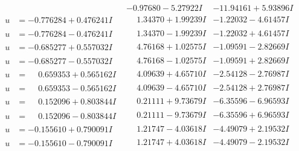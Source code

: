 \documentclass[1p]{elsarticle_modified}
\theoremstyle{definition}
\begin{document}
$$\begin{array}{c|c|c}
 & -0.97680 - 5.27922 I & -11.94161 + 5.93896 I \\ \hline\begin{aligned}
u &= -0.776284 + 0.476241 I\end{aligned}
 & \phantom{-}1.34370 + 1.99239 I & -1.22032 - 4.61457 I \\ \hline\begin{aligned}
u &= -0.776284 - 0.476241 I\end{aligned}
 & \phantom{-}1.34370 - 1.99239 I & -1.22032 + 4.61457 I \\ \hline\begin{aligned}
u &= -0.685277 + 0.557032 I\end{aligned}
 & \phantom{-}4.76168 + 1.02575 I & -1.09591 - 2.82669 I \\ \hline\begin{aligned}
u &= -0.685277 - 0.557032 I\end{aligned}
 & \phantom{-}4.76168 - 1.02575 I & -1.09591 + 2.82669 I \\ \hline\begin{aligned}
u &= \phantom{-}0.659353 + 0.565162 I\end{aligned}
 & \phantom{-}4.09639 + 4.65710 I & -2.54128 - 2.76987 I \\ \hline\begin{aligned}
u &= \phantom{-}0.659353 - 0.565162 I\end{aligned}
 & \phantom{-}4.09639 - 4.65710 I & -2.54128 + 2.76987 I \\ \hline\begin{aligned}
u &= \phantom{-}0.152096 + 0.803844 I\end{aligned}
 & \phantom{-}0.21111 + 9.73679 I & -6.35596 - 6.96593 I \\ \hline\begin{aligned}
u &= \phantom{-}0.152096 - 0.803844 I\end{aligned}
 & \phantom{-}0.21111 - 9.73679 I & -6.35596 + 6.96593 I \\ \hline\begin{aligned}
u &= -0.155610 + 0.790091 I\end{aligned}
 & \phantom{-}1.21747 - 4.03618 I & -4.49079 + 2.19532 I \\ \hline\begin{aligned}
u &= -0.155610 - 0.790091 I\end{aligned}
 & \phantom{-}1.21747 + 4.03618 I & -4.49079 - 2.19532 I \\ \hline\begin{aligned}

\end{aligned}
\end{array}$$
\end{document}

